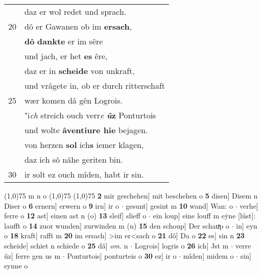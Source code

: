 \documentclass[8pt,a4paper,notitlepage]{article}
\begin{document}
\begin{table}[ht]
\begin{minipage}[t]{0.5\linewidth}
\begin{tabular}{rl}
 & daz er wol redet und sprach.\\ 
20 & dô er Gawanen ob im \textbf{ersach},\\ 
 & \textbf{dô} \textbf{dankte} er im sêre\\ 
 & und jach, er het \textbf{es} êre,\\ 
 & daz er in \textbf{scheide} von unkraft,\\ 
 & und vrâgete in, ob er durch ritterschaft\\ 
25 & wær komen dâ gên Logrois.\\ 
 & "i\textit{ch} streich ouch verr\textit{e} \textbf{\textit{û}z} Ponturtois\\ 
 & und wolte \textbf{âventiure hie} bejagen.\\ 
 & von herzen \textbf{sol} ich\textbf{s} iemer klagen,\\ 
 & daz ich sô nâhe geriten bin.\\ 
30 & ir solt ez ouch mîden, habt ir sin.\\ 
\end{tabular}
\scriptsize
\line(1,0){75} \newline
m n o \newline
\line(1,0){75} \newline
\newline
\line(1,0){75} \newline
\textbf{2} mir geschehen] mit beschehen o \textbf{5} disen] Disem n Diser o \textbf{6} ernern] erwern o \textbf{9} irn] ir o  $\cdot$ gesunt] gesint m \textbf{10} wand] Wan: o  $\cdot$ verhe] ferre o \textbf{12} ast] einen ast n (o) \textbf{13} sleif] slieff o  $\cdot$ ein loup] eine louff m eẏne [lúst]: laufft o \textbf{14} zuor wunden] zurwinden m (n) \textbf{15} den schoup] Der schauͯp o  $\cdot$ in] eyn o \textbf{18} kraft] rafft m \textbf{20} im ersach] >im er<sach o \textbf{21} dô] Da o \textbf{22} es] sin n \textbf{23} scheide] schiet n schiede o \textbf{25} dâ] \textit{om.} n  $\cdot$ Logrois] logris o \textbf{26} ich] Jst m  $\cdot$ verre ûz] ferre gen us m  $\cdot$ Ponturtois] ponturteis o \textbf{30} ez] ir o  $\cdot$ mîden] midem o  $\cdot$ sin] synne o \newline
\end{minipage}
\end{table}
\newpage
\end{document}
